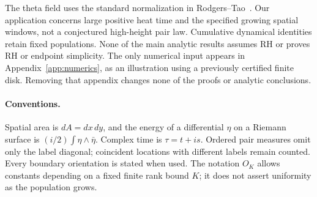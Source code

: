 The theta field uses the standard normalization in
Rodgers--Tao~\cite{RT}. Our application concerns large positive heat
time and the specified growing spatial windows, not a conjectured
high-height pair law. Cumulative dynamical identities retain fixed populations.
None of the main analytic results assumes RH or proves RH or endpoint
simplicity. The only numerical input appears in
Appendix~\ref{app:numerics}, as an illustration using a previously
certified finite disk. Removing that appendix changes none of the
proofs or analytic conclusions.

\paragraph{Conventions.}
Spatial area is $dA=dx\,dy$, and the energy of a differential $\eta$ on
a Riemann surface is $(i/2)\int\eta\wedge\bar\eta$. Complex time is
$\tau=t+is$. Ordered pair measures omit only the label diagonal;
coincident locations with different labels remain counted. Every
boundary orientation is stated when used. The notation $O_K$ allows
constants depending on a fixed finite rank bound $K$; it does not assert
uniformity as the population grows.
